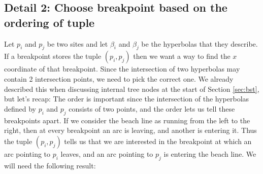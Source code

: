 \subsection*{Detail 2: Choose breakpoint based on the ordering of tuple}
Let $p_i$ and $p_j$ be two sites and let $\beta_i$ and $\beta_j$ be the hyperbolas that they describe. If a breakpoint stores the tuple $(p_i, p_j)$ then we want a way to find the $x$ coordinate of that breakpoint. Since the intersection of two hyperbolas may contain 2 intersection points, we need to pick the correct one. We already described this when discussing internal tree nodes at the start of Section \ref{sec:bst}, but let's recap: The order is important since the intersection of the hyperbolas defined by $p_i$ and $p_j$ consists of two points, and the order lets us tell these breakpoints apart. If we consider the beach line as running from the left to the right, then at every breakpoint an arc is leaving, and another is entering it. Thus the tuple $(p_i, p_j)$ tells us that we are interested in the breakpoint at which an arc pointing to $p_i$ leaves, and an arc pointing to $p_j$ is entering the beach line. We will need the following result:


